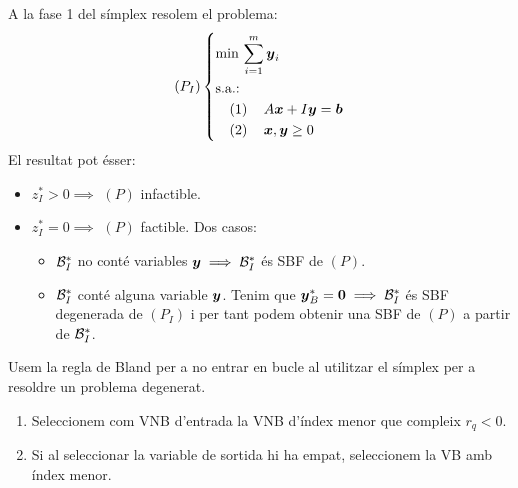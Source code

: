 \begin{obs}
    A la fase 1 del símplex resolem el problema:
    \begin{equation*}
        \lp P_I \rp \begin{dcases*}
            \min\, \sum_{i = 1}^m \vb{y}_i \\
            \text{s.a.: } \\
            \quad \left( 1 \right) \quad A\vb{x} + I\vb{y} = \vb{b} \\
            \quad \left( 2 \right) \quad \vb{x}, \vb{y} \geq 0 \\
        \end{dcases*}
    \end{equation*}
    El resultat pot ésser:
    \begin{itemize}
        \item $z_I^* > 0 \implies$ $\left(P\right)$ infactible.
        \item $z_I^* = 0 \implies$ $\left(P\right)$ factible. Dos casos:
            \begin{itemize}
                \item $\mathcal{B}_I^*$ no conté variables $\boldsymbol{y} \implies \mathcal{B}_I^*$ és SBF de $\left(P\right)$.
                \item $\mathcal{B}_I^*$ conté alguna variable $\boldsymbol{y}$. Tenim que $\boldsymbol{y}_B^* = \boldsymbol{0} \implies \mathcal{B}_I^*$ és SBF degenerada de $\left(P_I\right)$ i per tant podem obtenir una SBF de $\left(P\right)$ a partir de $\mathcal{B}_I^*$.
            \end{itemize}
    \end{itemize}
\end{obs}
\begin{rgl}[de Bland] \label{rgl:bland}
    Usem la regla de Bland per a no entrar en bucle al utilitzar el símplex per a resoldre un problema degenerat.
    \begin{enumerate}
        \item Seleccionem com VNB d'entrada la VNB d'índex menor que compleix $r_q < 0$.
        \item Si al seleccionar la variable de sortida hi ha empat, seleccionem la VB amb índex menor.
    \end{enumerate}
\end{rgl}